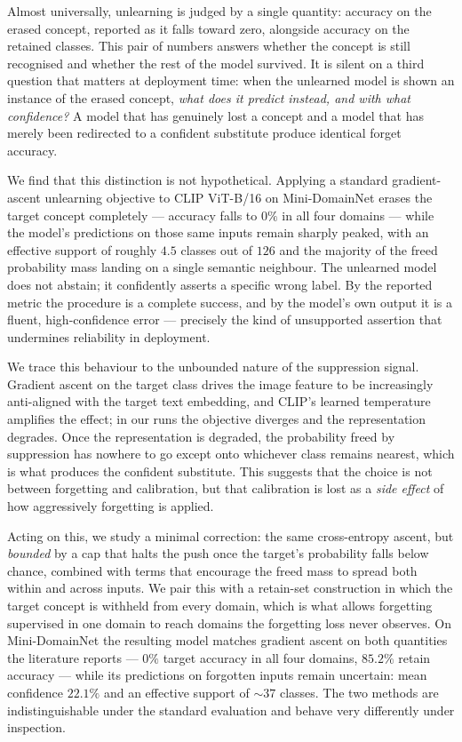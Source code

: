 \documentclass[10pt]{article}
\begin{document}
Almost universally, unlearning is judged by a single quantity: accuracy on the
erased concept, reported as it falls toward zero, alongside accuracy on the
retained classes. This pair of numbers answers whether the concept is still
recognised and whether the rest of the model survived. It is silent on a third
question that matters at deployment time: when the unlearned model is shown an
instance of the erased concept, \emph{what does it predict instead, and with what
confidence?} A model that has genuinely lost a concept and a model that has
merely been redirected to a confident substitute produce identical forget
accuracy.

We find that this distinction is not hypothetical. Applying a standard
gradient-ascent unlearning objective to CLIP ViT-B/16 on Mini-DomainNet erases
the target concept completely --- accuracy falls to $0\%$ in all four domains ---
while the model's predictions on those same inputs remain sharply peaked, with
an effective support of roughly $4.5$ classes out of $126$ and the majority of
the freed probability mass landing on a single semantic neighbour. The unlearned
model does not abstain; it confidently asserts a specific wrong label. By the
reported metric the procedure is a complete success, and by the model's own
output it is a fluent, high-confidence error --- precisely the kind of
unsupported assertion that undermines reliability in deployment.

We trace this behaviour to the unbounded nature of the suppression signal.
Gradient ascent on the target class drives the image feature to be increasingly
anti-aligned with the target text embedding, and CLIP's learned temperature
amplifies the effect; in our runs the objective diverges and the representation
degrades. Once the representation is degraded, the probability freed by
suppression has nowhere to go except onto whichever class remains nearest, which
is what produces the confident substitute. This suggests that the choice is not
between forgetting and calibration, but that calibration is lost as a
\emph{side effect} of how aggressively forgetting is applied.

Acting on this, we study a minimal correction: the same cross-entropy ascent,
but \emph{bounded} by a cap that halts the push once the target's probability
falls below chance, combined with terms that encourage the freed mass to spread
both within and across inputs. We pair this with a retain-set construction in
which the target concept is withheld from every domain, which is what allows
forgetting supervised in one domain to reach domains the forgetting loss never
observes. On Mini-DomainNet the resulting model matches gradient ascent on both
quantities the literature reports --- $0\%$ target accuracy in all four domains,
$85.2\%$ retain accuracy --- while its predictions on forgotten inputs remain
uncertain: mean confidence $22.1\%$ and an effective support of $\sim\!37$
classes. The two methods are indistinguishable under the standard evaluation and
behave very differently under inspection.
\end{document}
